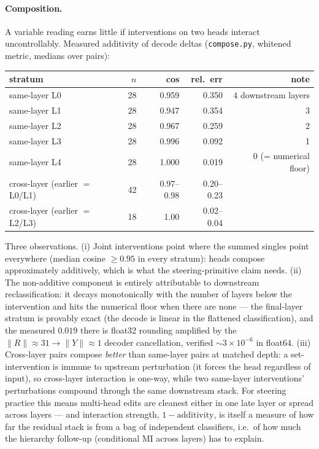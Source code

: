 \documentclass[11pt]{article}
\begin{document}
\paragraph{Composition.}
A variable reading earns little if interventions on two heads interact
uncontrollably. Measured additivity of decode deltas
(\texttt{compose.py}, whitened metric, medians over pairs):

\begin{center}
\begin{tabular}{@{}lrrrr@{}}
\toprule
stratum & $n$ & cos & rel.\ err & note \\
\midrule
same-layer L0 & 28 & 0.959 & 0.350 & 4 downstream layers \\
same-layer L1 & 28 & 0.947 & 0.354 & 3 \\
same-layer L2 & 28 & 0.967 & 0.259 & 2 \\
same-layer L3 & 28 & 0.996 & 0.092 & 1 \\
same-layer L4 & 28 & 1.000 & 0.019 & 0 (= numerical floor) \\
cross-layer (earlier $=$ L0/L1) & 42 & 0.97--0.98 & 0.20--0.23 & \\
cross-layer (earlier $=$ L2/L3) & 18 & 1.00 & 0.02--0.04 & \\
\bottomrule
\end{tabular}
\end{center}

Three observations. (i) Joint interventions point where the summed
singles point everywhere (median cosine $\ge 0.95$ in every stratum):
heads compose approximately additively, which is what the
steering-primitive claim needs. (ii) The non-additive component is
entirely attributable to downstream reclassification: it decays
monotonically with the number of layers below the intervention and hits
the numerical floor when there are none --- the final-layer stratum is
provably exact (the decode is linear in the flattened classification),
and the measured $0.019$ there is float32 rounding amplified by the
$\|R\|{\approx}31 \to \|Y\|{\approx}1$ decoder cancellation, verified
${\sim}3{\times}10^{-6}$ in float64. (iii) Cross-layer pairs compose
\emph{better} than same-layer pairs at matched depth: a set-intervention
is immune to upstream perturbation (it forces the head regardless of
input), so cross-layer interaction is one-way, while two same-layer
interventions' perturbations compound through the same downstream stack.
For steering practice this means multi-head edits are cleanest either in
one late layer or spread across layers --- and interaction strength,
$1{-}\mathrm{additivity}$, is itself a measure of how far the residual
stack is from a bag of independent classifiers, i.e.\ of how much the
hierarchy follow-up (conditional MI across layers) has to explain.
\end{document}
